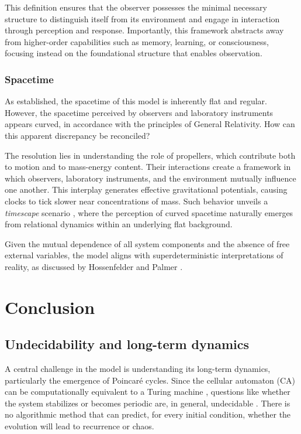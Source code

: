 \documentclass[12pt,english]{article}
\begin{document}
This definition ensures that the observer possesses the minimal necessary structure to distinguish itself from its environment and engage in interaction through perception and response. Importantly, this framework abstracts away from higher-order capabilities such as memory, learning, or consciousness, focusing instead on the foundational structure that enables observation.

\subsubsection{Spacetime}
As established, the spacetime of this model is inherently flat and regular. However, the spacetime perceived by observers and laboratory instruments appears curved, in accordance with the principles of General Relativity. How can this apparent discrepancy be reconciled?  

The resolution lies in understanding the role of propellers, which contribute both to motion and to mass-energy content. Their interactions create a framework in which observers, laboratory instruments, and the environment mutually influence one another. This interplay generates effective gravitational potentials, causing clocks to tick slower near concentrations of mass. Such behavior unveils a \textit{timescape} scenario \cite{duley2013timescape}, where the perception of curved spacetime naturally emerges from relational dynamics within an underlying flat background.

Given the mutual dependence of all system components and the absence of free external variables, the model aligns with superdeterministic interpretations of reality, as discussed by Hossenfelder and Palmer \cite{hossenfelder2020rethinking}.


\section{Conclusion\label{sec:Discussion}}

\subsection{Undecidability and long-term dynamics}\label{sec-undecidability}

A central challenge in the model is understanding its long-term dynamics, particularly the emergence of Poincaré cycles. Since the cellular automaton (CA) can be computationally equivalent to a Turing machine \cite{wolfram1983}, questions like whether the system stabilizes or becomes periodic are, in general, undecidable \cite{gacs1979}. There is no algorithmic method that can predict, for every initial condition, whether the evolution will lead to recurrence or chaos.
\end{document}
